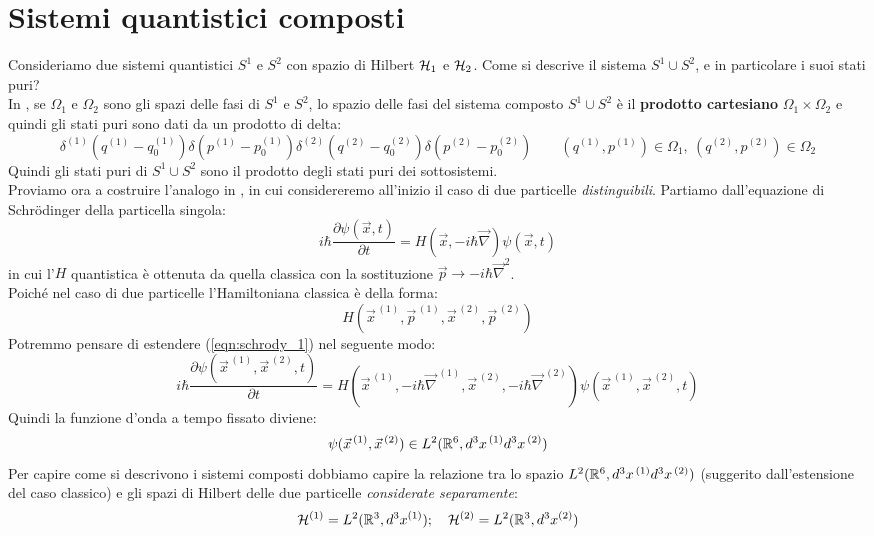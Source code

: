 \documentclass[../../FisicaTeorica.tex]{subfiles}
\begin{document}
\section{Sistemi quantistici composti}
Consideriamo due sistemi quantistici $S^1$ e $S^2$ con spazio di Hilbert $\mathcal{H}_1$ e $\mathcal{H}_2$. Come si descrive il sistema $S^1 \cup S^2$, e in particolare i suoi stati puri?\\

In \MC, se $\Omega_1$ e $\Omega_2$ sono gli spazi delle fasi di $S^1$ e $S^2$, lo spazio delle fasi del sistema composto $S^1 \cup S^2$ è il \textbf{prodotto cartesiano} $\Omega_1\times \Omega_2$ e quindi gli stati puri sono dati da un prodotto di delta:
\[
\delta^{(1)} (q^{(1)}-q_0^{(1)})\delta(p^{(1)}-p_0^{(1)}) \delta^{(2)}(q^{(2)}-q_0^{(2)})\delta(p^{(2)}-p_0^{(2)}) \qquad (q^{(1)}, p^{(1)})\in \Omega_1,\> (q^{(2)}, p^{(2)}) \in \Omega_2
\] 
Quindi gli stati puri di $S^1 \cup S^2$ sono il prodotto degli stati puri dei sottosistemi.\\

Proviamo ora a costruire l'analogo in \MQ, in cui considereremo all'inizio il caso di due particelle \textit{distinguibili}.  Partiamo dall'equazione di Schr\"odinger della particella singola:
\begin{equation}
i\hbar \frac{\partial \psi(\vec{x},t)}{\partial t}=H(\vec{x}, -i\hbar\vec{\nabla})\psi(\vec{x},t)
\label{eqn:schrody_1}
\end{equation}
in cui l'$H$ quantistica è ottenuta da quella classica con la sostituzione $\vec{p} \to -i\hbar\vec{\nabla}^2$.\\
Poiché nel caso di due particelle l'Hamiltoniana classica è della forma:
\[
H(\vec{x}^{\,(1)}, \vec{p}^{\,(1)}, \vec{x}^{\,(2)}, \vec{p}^{\,(2)})
\]
Potremmo pensare di estendere (\ref{eqn:schrody_1}) nel seguente modo:
\[
i\hbar \frac{\partial \psi(\vec{x}^{\,(1)}, \vec{x}^{\,(2)},t)}{\partial t} = H(\vec{x}^{\,(1)},-i\hbar \vec{\nabla}^{\,(1)}, \vec{x}^{\,(2)}, -i\hbar\vec{\nabla}^{\,(2)})\psi(\vec{x}^{\,(1)},\vec{x}^{\,(2)},t)
\]
Quindi la funzione d'onda a tempo fissato diviene:
\[
\psi(\vec{x}^{\,(1)}, \vec{x}^{\,(2)})\in L^2(\mathbb{R}^6, d^3 x^{\,(1)} d^3 x^{\,(2)})
\]
Per capire come si descrivono i sistemi composti dobbiamo capire la relazione tra lo spazio $L^2(\mathbb{R}^6, d^3 x^{\,(1)} d^3 x^{\,(2)})$ (suggerito dall'estensione del caso classico) e gli spazi di Hilbert  delle due particelle \textit{considerate separamente}:
\[
\mathcal{H}^{(1)}=L^2(\mathbb{R}^3, d^3 x^{(1)}); \quad \mathcal{H}^{(2)}=L^2(\mathbb{R}^3, d^3 x^{(2)})
\]
\end{document}
